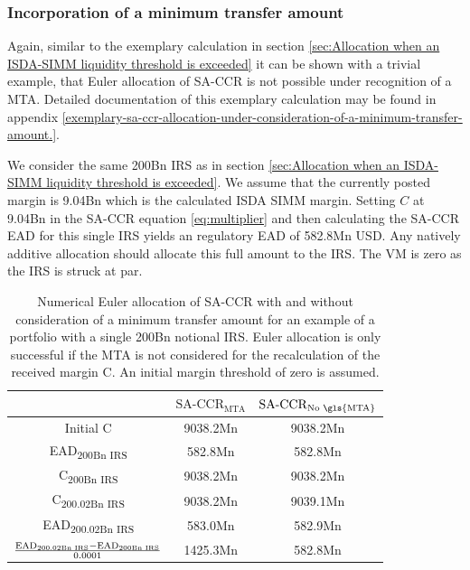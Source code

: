 \documentclass[../Thesis_AHoecherl.tex]{subfiles}
\begin{document}
    \subsubsection{Incorporation of a minimum transfer amount}\label{sec:Incorporation of a minimum transfer amount}

    Again, similar to the exemplary calculation in section \ref{sec:Allocation when an ISDA-SIMM liquidity threshold is exceeded} it can be shown with a trivial example, that Euler allocation of \gls{SA-CCR} is not possible under recognition of a \gls{MTA}. Detailed documentation of this exemplary calculation may be found in appendix \ref{exemplary-sa-ccr-allocation-under-consideration-of-a-minimum-transfer-amount.}.
    
    We consider the same 200Bn \gls{IRS} as in section \ref{sec:Allocation when an ISDA-SIMM liquidity threshold is exceeded}. We assume that the currently posted margin is 9.04Bn which is the calculated \gls{ISDA SIMM} margin. 
    Setting $C$ at 9.04Bn in the \gls{SA-CCR} equation \ref{eq:multiplier} and then calculating the \gls{SA-CCR} \gls{EAD} for this single \gls{IRS} yields an regulatory \gls{EAD} of 582.8Mn USD. Any natively additive allocation should allocate this full amount to the \gls{IRS}.
    The \gls{VM} is zero as the \gls{IRS} is struck at par. 
    \begin{table}[htbp]
        \centering
        \begin{tabular}{c|c|c}
            & $\text{SA-CCR}_{\text{MTA}}$ & $\text{SA-CCR}_{\text{No \gls{MTA}}}$ \\
            \toprule
            Initial C & 9038.2Mn & 9038.2Mn \\
            \midrule
            EAD\textsubscript{200Bn IRS} & 582.8Mn & 582.8Mn \\
            \midrule
            C\textsubscript{200Bn IRS} & 9038.2Mn & 9038.2Mn \\
            \midrule
            C\textsubscript{200.02Bn IRS} & 9038.2Mn & 9039.1Mn \\
            \midrule
            EAD\textsubscript{200.02Bn IRS} & 583.0Mn & 582.9Mn \\
            \midrule
            $\frac{\text{EAD\textsubscript{200.02Bn IRS}}-\text{EAD\textsubscript{200Bn IRS}}}{0.0001}$ & 1425.3Mn & 582.8Mn  \\
        \end{tabular}%
        \caption[Impact of an \gls{MTA} on an allocation]{Numerical Euler allocation of \gls{SA-CCR} with and without consideration of a minimum transfer amount for an example of a portfolio with a single 200Bn notional \gls{IRS}. Euler allocation is only successful if the \gls{MTA} is not considered for the recalculation of the received margin C. An initial margin threshold of zero is assumed.}
        \label{tab:Allocate SA-CCR with MTA calculation}
    \end{table}
\end{document}
